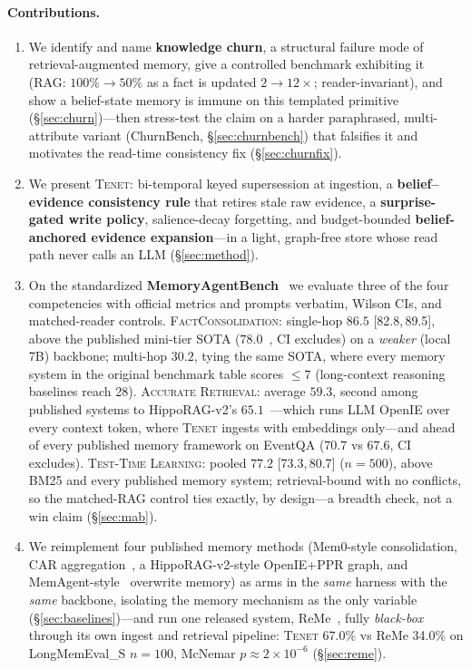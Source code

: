 \documentclass[11pt]{article}
\newcommand{\tenet}{\textsc{Tenet}}
\newcommand{\ci}[2]{{\footnotesize[#1,\,#2]}}
\begin{document}
\paragraph{Contributions.}
\begin{enumerate}
\item We identify and name \textbf{knowledge churn}, a structural failure mode of
  retrieval-augmented memory, give a controlled benchmark exhibiting it (RAG:
  $100\%\!\to\!50\%$ as a fact is updated $2\!\to\!12\times$; reader-invariant), and show
  a belief-state memory is immune on this templated primitive (\S\ref{sec:churn})---then
  stress-test the claim on a harder paraphrased, multi-attribute variant (ChurnBench,
  \S\ref{sec:churnbench}) that falsifies it and motivates the read-time consistency fix
  (\S\ref{sec:churnfix}).
\item We present \tenet{}: bi-temporal keyed supersession at ingestion, a
  \textbf{belief--evidence consistency rule} that retires stale raw evidence, a
  \textbf{surprise-gated write policy}, salience-decay forgetting, and budget-bounded
  \textbf{belief-anchored evidence expansion}---in a light, graph-free store whose read
  path never calls an LLM (\S\ref{sec:method}).
\item On the standardized \textbf{MemoryAgentBench}~\cite{mab} we evaluate three of the
  four competencies with official metrics and prompts verbatim, Wilson CIs, and matched-reader
  controls. \textsc{FactConsolidation}: single-hop $86.5$ \ci{82.8}{89.5}, above the
  published mini-tier SOTA ($78.0$~\cite{freshness}, CI excludes) on a \emph{weaker}
  (local 7B) backbone; multi-hop $30.2$, tying the same SOTA, where every memory system in the
  original benchmark table scores $\le 7$ (long-context reasoning baselines reach 28). \textsc{Accurate Retrieval}: average $59.3$,
  second among published systems to HippoRAG-v2's $65.1$~\cite{hipporag2}---which runs
  LLM OpenIE over every context token, where \tenet{} ingests with embeddings
  only---and ahead of every published memory framework on EventQA ($70.7$ vs $67.6$, CI excludes).
  \textsc{Test-Time Learning}: pooled $77.2$ \ci{73.3}{80.7} ($n{=}500$), above BM25
  and every published memory system; retrieval-bound with no conflicts, so the
  matched-RAG control ties exactly, by design---a breadth check, not a win claim
  (\S\ref{sec:mab}).
\item We reimplement four published memory methods (Mem0-style consolidation, CAR
  aggregation~\cite{freshness}, a HippoRAG-v2-style OpenIE+PPR graph, and
  MemAgent-style~\cite{memagent} overwrite memory) as arms in the \emph{same} harness with
  the \emph{same} backbone, isolating the memory mechanism as the only variable
  (\S\ref{sec:baselines})---and run one released system, ReMe~\cite{reme}, fully
  \emph{black-box} through its own ingest and retrieval pipeline: \tenet{} 67.0\% vs
  ReMe 34.0\% on LongMemEval\_S $n{=}100$, McNemar $p\approx2\times10^{-6}$
  (\S\ref{sec:reme}).
\end{enumerate}
\end{document}
